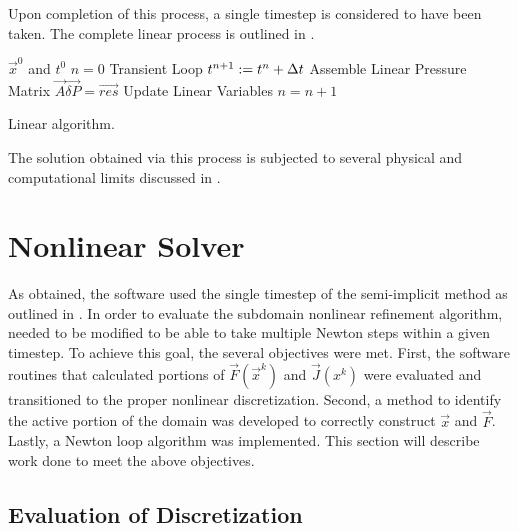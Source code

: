 Upon completion of this process, a single timestep is considered to have been taken.
The complete linear process is outlined in .

\begin{algo}[ht!]
\setlength{\baselineskip}{0.625\baselineskip}
\begin{algorithmic}[1]
\Require $\vec{x}^{0}$ and $t^{0}$
\Set $n = 0$
\Loop \; Transient Loop
    \Set $t^{n+1} : = t^{n} + \dt{}$
	\Algorithm Assemble Linear Pressure Matrix 
   	\Solve $\vec{A} \vec{\delta P} = \vec{res}$
	\Algorithm Update Linear Variables 
	\Set $n = n + 1$
\EndLoop
\end{algorithmic}
\caption{Linear \cobra{} algorithm.}
\label{alg:linCobraAlgorithm}
\end{algo}

The solution obtained via this process is subjected to several physical and computational limits discussed in .

\section{Nonlinear Solver}
\label{sect:nlnCobraSolver}
As obtained, the \cobra{} software used the single timestep of the semi-implicit method as outlined in .
In order to evaluate the subdomain nonlinear refinement algorithm, \cobra{} needed to be modified to be able to take multiple Newton steps within a given timestep.
To achieve this goal, the several objectives were met.
First, the software routines that calculated portions of $\vec{F}(\vec{x}^{k})$ and $\vec{J}(x^{k})$ were evaluated and transitioned to the proper nonlinear discretization.
Second, a method to identify the active portion of the domain was developed to correctly construct $\vec{x}$ and $\vec{F}$.
Lastly, a Newton loop algorithm was implemented.
This section will describe work done to meet the above objectives.

\subsection{Evaluation of Discretization}
\label{subsect:nonlinearDiscretization}

